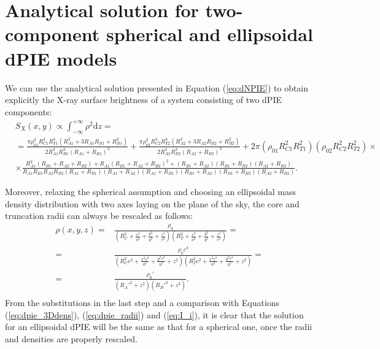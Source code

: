 \documentclass[twocolumn]{aastex61}
\begin{document}
\section{Analytical solution for two-component spherical and ellipsoidal dPIE models}
\label{sec:d2PIE}
We can use the analytical solution presented in Equation (\ref{eq:dNPIE}) to
obtain explicitly the X-ray surface brightness of a system consisting of two
dPIE components:
\begin{equation}
\begin{split}
&S_X(x,y) \propto \int_{-\infty}^{+\infty}\!\!\! \rho^2 \text{d}z =\\
& = \frac{ \pi \rho_{01}^2 R_{C1}^4 R_{T1}^4 \left(  R_{A1}^2 + 3 R_{A1} R_{B1} + R_{B1}^2 \right)}
{ 2 R_{A1}^3 R_{B1}^3  \left(R_{A1} + R_{B1}\right)^3 } 
+ \frac{ \pi \rho_{02}^2 R_{C2}^4 R_{T2}^4 \left(  R_{A2}^2 + 3 R_{A2} R_{B2} + R_{B2}^2 \right)}
{ 2 R_{A2}^3 R_{B2}^3  \left(R_{A2} + R_{B2}\right)^3 } 
+ 2 \pi \left( \rho_{01} R_{C1}^2 R_{T1}^2 \right) \left( \rho_{02} R_{C2}^2 R_{T2}^2 \right)   \times \\
&\times \frac{ R_{A1}^2 (R_{B1}+R_{A2}+R_{B2}) + R_{A1} (R_{B1}+R_{A2}+R_{B2})^2
            + (R_{B1}+R_{A2}) (R_{B1}+R_{B2}) (R_{A2}+R_{B2}) }
            {R_{A1} R_{B1} R_{A2} R_{B2} (R_{A1}+R_{B1}) (R_{A1}+R_{A2}) (R_{A1}+R_{B2})
             (R_{B1}+R_{A2}) (R_{B1}+R_{B2}) (R_{A2}+R_{B2})}.
\end{split}
\end{equation}

Moreover, relaxing the spherical assumption and choosing an ellipsoidal mass
density distribution with two axes laying on the plane of the sky, the core and
truncation radii can always be rescaled as follows:
\begin{equation}
\begin{split}
\rho(x,y,z) = & \frac{\rho_0}{ \left( R_{C}^2 + \frac{x^2}{a^2} + \frac{y^2}{b^2} + \frac{z^2}{c^2} \right) 
                 \left( R_{T}^2 + \frac{x^2}{a^2} + \frac{y^2}{b^2} + \frac{z^2}{c^2} \right)} = \\
= & \frac{\rho_0 c^4}{ \left( R_{C}^2 c^2 + \frac{x^2 c^2}{a^2} + \frac{y^2 c^2}{b^2} + z^2 \right)
                 \left( R_{T}^2 c^2 + \frac{x^2 c^2}{a^2} + \frac{y^2 c^2}{b^2} + z^2 \right) } = \\
= & \frac{\rho_0'}{ \left( R_{A}'^2 + z^2 \right) \left( R_{B}'^2 + z^2 \right) }.\\
\end{split}
\end{equation}
From the substitutions in the last step and a comparison with Equations
(\ref{eq:dpie_3Ddens}), (\ref{eq:dpie_radii}) and (\ref{eq:I_i}), it is clear
that the solution for an ellipsoidal dPIE will be the same as that for a
spherical one, once the radii and densities are properly rescaled.





\end{document}

